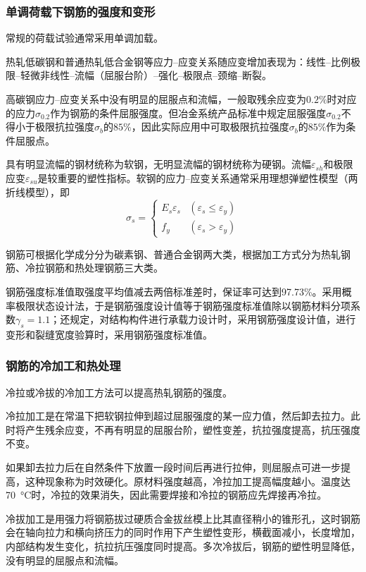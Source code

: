 \documentclass{article}
\begin{document}
\subsubsection{单调荷载下钢筋的强度和变形}
\par 常规的荷载试验通常采用单调加载。
\par 热轧低碳钢和普通热轧低合金钢等应力--应变关系随应变增加表现为：线性--比例极限--轻微非线性--流幅（屈服台阶）--强化--极限点--颈缩--断裂。
\par 高碳钢应力--应变关系中没有明显的屈服点和流幅，一般取残余应变为$0.2\%$时对应的应力$\sigma_{0.2}$作为钢筋的条件屈服强度。但冶金系统产品标准中规定屈服强度$\sigma_{0.2}$不得小于极限抗拉强度$\sigma_b$的$85\%$，因此实际应用中可取极限抗拉强度$\sigma_b$的$85\%$作为条件屈服点。
\par 具有明显流幅的钢材统称为软钢，无明显流幅的钢材统称为硬钢。流幅$\varepsilon_{sh}$和极限应变$\varepsilon_{su}$是较重要的塑性指标。软钢的应力--应变关系通常采用理想弹塑性模型（两折线模型），即
$$
      \sigma_s =
      \left\{ \begin{aligned}
            E_s \varepsilon_s & (\varepsilon_s \leq \varepsilon_y) \\
            f_y               & (\varepsilon_s >\varepsilon_y)
      \end{aligned} \right.
$$
\par 钢筋可根据化学成分分为碳素钢、普通合金钢两大类，根据加工方式分为热轧钢筋、冷拉钢筋和热处理钢筋三大类。
\par 钢筋强度标准值取强度平均值减去两倍标准差时，保证率可达到97.73\%。\gb{}采用概率极限状态设计法，于是钢筋强度设计值等于钢筋强度标准值除以钢筋材料分项系数$\gamma_s=1.1$；还规定，对结构构件进行承载力设计时，采用钢筋强度设计值，进行变形和裂缝宽度验算时，采用钢筋强度标准值。
\subsubsection{钢筋的冷加工和热处理}
\par 冷拉或冷拔的冷加工方法可以提高热轧钢筋的强度。
\par 冷拉加工是在常温下把软钢拉伸到超过屈服强度的某一应力值，然后卸去拉力。此时将产生残余应变，不再有明显的屈服台阶，塑性变差，抗拉强度提高，抗压强度不变。
\par 如果卸去拉力后在自然条件下放置一段时间后再进行拉伸，则屈服点可进一步提高，这种现象称为时效硬化。原材料强度越高，冷拉加工提高幅度越小。温度达\SI{70}{\degreeCelsius}时，冷拉的效果消失，因此需要焊接和冷拉的钢筋应先焊接再冷拉。
\par 冷拔加工是用强力将钢筋拔过硬质合金拔丝模上比其直径稍小的锥形孔，这时钢筋会在轴向拉力和横向挤压力的同时作用下产生塑性变形，横截面减小，长度增加，内部结构发生变化，抗拉抗压强度同时提高。多次冷拔后，钢筋的塑性明显降低，没有明显的屈服点和流幅。
\end{document}
